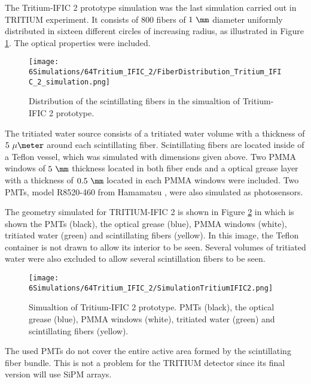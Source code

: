 The Tritium-IFIC 2 prototype simulation was the last simulation carried out in TRITIUM experiment. It consists of $800$ fibers of $1~\mm$ diameter uniformly distributed in sixteen different circles of increasing radius, as illustrated in Figure \ref{fig:FibersTritiumIFIC2Simulation}. The optical properties were included.

\begin{figure}[h]
\centering
\texttt{[image: 6Simulations/64Tritium\_IFIC\_2/FiberDistribution\_Tritium\_IFIC\_2\_simulation.png]}
\caption{Distribution of the scintillating fibers in the simualtion of Tritium-IFIC 2 prototype.\label{fig:FibersTritiumIFIC2Simulation}}
\end{figure}
The tritiated water source consists of a tritiated water volume with a thickness of $5~\mu\meter$ around each scintillating fiber. Scintillating fibers are located inside of a Teflon vessel, which was simulated with dimensions given above. Two PMMA windows of $5~\mm$ thickness located in both fiber ends and a optical grease layer with a thickness of $0.5~\mm$ located in each PMMA windows were included. Two PMTs, model R8520-460 from Hamamatsu \cite{DataSheetPMTs}, were also simulated as photosensors. 


The geometry simulated for TRITIUM-IFIC 2 is shown in Figure \ref{fig:TritiumIFIC2Simulation} in which is shown the PMTs (black), the optical grease (blue), PMMA windows (white), tritiated water (green) and scintillating fibers (yellow). In this image, the Teflon container is not drawn to allow its interior to be seen. Several volumes of tritiated water were also excluded to allow several scintillation fibers to be seen.

\begin{figure}[h]
\centering
\texttt{[image: 6Simulations/64Tritium\_IFIC\_2/SimulationTritiumIFIC2.png]}
\caption{Simualtion of Tritium-IFIC 2 prototype. PMTs (black), the optical grease (blue), PMMA windows (white), tritiated water (green) and scintillating fibers (yellow). \label{fig:TritiumIFIC2Simulation}}
\end{figure}

The used PMTs do not cover the entire active area formed by the scintillating fiber bundle. This is not a problem for the TRITIUM detector since its final version will use SiPM arrays.

